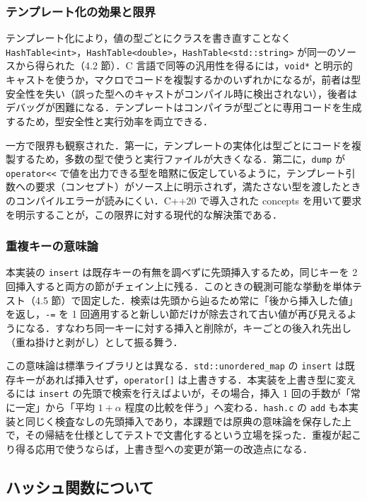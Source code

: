 \subsubsection{テンプレート化の効果と限界}

テンプレート化により，値の型ごとにクラスを書き直すことなく {\tt HashTable<int>}，{\tt HashTable<double>}，{\tt HashTable<std::string>} が同一のソースから得られた（4.2 節）．C 言語で同等の汎用性を得るには，{\tt void*} と明示的キャストを使うか，マクロでコードを複製するかのいずれかになるが，前者は型安全性を失い（誤った型へのキャストがコンパイル時に検出されない），後者はデバッグが困難になる．テンプレートはコンパイラが型ごとに専用コードを生成するため，型安全性と実行効率を両立できる．

一方で限界も観察された．第一に，テンプレートの実体化は型ごとにコードを複製するため，多数の型で使うと実行ファイルが大きくなる．第二に，{\tt dump} が {\tt operator<<} で値を出力できる型を暗黙に仮定しているように，テンプレート引数への要求（コンセプト）がソース上に明示されず，満たさない型を渡したときのコンパイルエラーが読みにくい．C++20 で導入された concepts を用いて要求を明示することが，この限界に対する現代的な解決策である．

\subsubsection{重複キーの意味論}

本実装の {\tt insert} は既存キーの有無を調べずに先頭挿入するため，同じキーを 2 回挿入すると両方の節がチェイン上に残る．このときの観測可能な挙動を単体テスト（4.5 節）で固定した．検索は先頭から辿るため常に「後から挿入した値」を返し，{\tt -=} を 1 回適用すると新しい節だけが除去されて古い値が再び見えるようになる．すなわち同一キーに対する挿入と削除が，キーごとの後入れ先出し（重ね掛けと剥がし）として振る舞う．

この意味論は標準ライブラリとは異なる．{\tt std::unordered\_map} の {\tt insert} は既存キーがあれば挿入せず，{\tt operator[]} は上書きする．本実装を上書き型に変えるには {\tt insert} の先頭で検索を行えばよいが，その場合，挿入 1 回の手数が「常に一定」から「平均 $1+\alpha$ 程度の比較を伴う」へ変わる．{\tt hash.c} の {\tt add} も本実装と同じく検査なしの先頭挿入であり，本課題では原典の意味論を保存した上で，その帰結を仕様としてテストで文書化するという立場を採った．重複が起こり得る応用で使うならば，上書き型への変更が第一の改造点になる．

\subsection{ハッシュ関数について}

